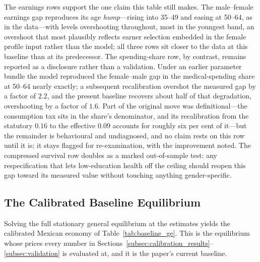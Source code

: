 \documentclass[12pt,a4paper]{article}
\begin{document}
The earnings rows support the one claim this table still makes. The male--female earnings gap reproduces its age \emph{hump}---rising into 35--49 and easing at 50--64, as in the data---with levels overshooting throughout, most in the youngest band, an overshoot that most plausibly reflects earner selection embedded in the female profile input rather than the model; all three rows sit closer to the data at this baseline than at its predecessor. The spending-share row, by contrast, remains reported as a disclosure rather than a validation. Under an earlier parameter bundle the model reproduced the female--male gap in the medical-spending share at 50--64 nearly exactly; a subsequent recalibration overshot the measured gap by a factor of $2.2$, and the present baseline recovers about half of that degradation, overshooting by a factor of $1.6$. Part of the original move was definitional---the consumption tax sits in the share's denominator, and its recalibration from the statutory $0.16$ to the effective $0.09$ accounts for roughly six per cent of it---but the remainder is behavioural and undiagnosed, and no claim rests on this row until it is; it stays flagged for re-examination, with the improvement noted. The compressed survival row doubles as a marked out-of-sample test: any respecification that lets low-education health off the ceiling should reopen this gap toward its measured value without touching anything gender-specific.

\subsection{The Calibrated Baseline Equilibrium}
\label{subsec:calibrated_baseline}

Solving the full stationary general equilibrium at the estimates yields the calibrated Mexican economy of Table~\ref{tab:baseline_ge}. This is the equilibrium whose prices every number in Sections~\ref{subsec:calibration_results}--\ref{subsec:validation} is evaluated at, and it is the paper's current baseline.
\end{document}
